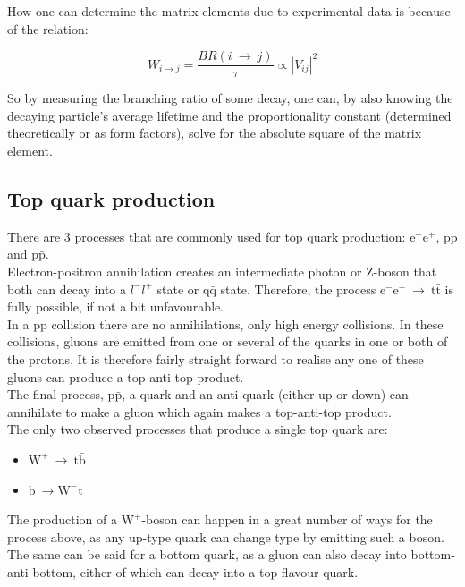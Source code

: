 \documentclass[11pt,a4paper]{article}
\begin{document}
How one can determine the matrix elements due to experimental data is because of the relation:

\begin{equation}
W_{i\rightarrow j} = \frac{BR(i \:\rightarrow\: j)}{\tau} \propto |V_{ij}|^2
\end{equation}

So by measuring the branching ratio of some decay, one can, by also knowing the decaying particle's average lifetime and the proportionality constant (determined theoretically or as form factors), solve for the absolute square of the matrix element.

\subsection{Top quark production}
There are 3 processes that are commonly used for top quark production: $\text{e}^-\text{e}^+$, $\text{p}\text{p}$ and $\text{p}\bar{\text{p}}$.\\
Electron-positron annihilation creates an intermediate photon or Z-boson that both can decay into a $l^-l^+$ state or $\text{q}\bar{\text{q}}$ state. Therefore, the process $\text{e}^-\text{e}^+ \:\rightarrow\: \text{t}\bar{\text{t}}$ is fully possible, if not a bit unfavourable.\\
In a pp collision there are no annihilations, only high energy collisions. In these collisions, gluons are emitted from one or several of the quarks in one or both of the protons. It is therefore fairly straight forward to realise any one of these gluons can produce a top-anti-top product.\\
The final process, $\text{p}\bar{\text{p}}$, a quark and an anti-quark (either up or down) can annihilate to make a gluon which again makes a top-anti-top product.\\
The only two observed processes that produce a single top quark are:

\begin{itemize}
	\item $\text{W}^+\:\rightarrow\:\text{t}\bar{\text{b}}$
	\item $\text{b}\:\rightarrow\text{W}^-\text{t}$
\end{itemize}

The production of a $\text{W}^+$-boson can happen in a great number of ways for the process above, as any up-type quark can change type by emitting such a boson. The same can be said for a bottom quark, as a gluon can also decay into bottom-anti-bottom, either of which can decay into a top-flavour quark.\\
\end{document}

